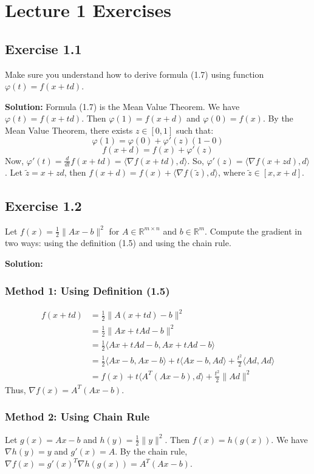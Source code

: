 \documentclass{article}
\begin{document}
\section*{Lecture 1 Exercises}

\subsection*{Exercise 1.1}
Make sure you understand how to derive formula (1.7) using function $\varphi(t) = f(x + td)$.

\textbf{Solution:}
Formula (1.7) is the Mean Value Theorem. We have $\varphi(t) = f(x + td)$.
Then $\varphi(1) = f(x + d)$ and $\varphi(0) = f(x)$.
By the Mean Value Theorem, there exists $z \in [0, 1]$ such that:
\[
\varphi(1) = \varphi(0) + \varphi'(z)(1 - 0)
\]
\[
f(x + d) = f(x) + \varphi'(z)
\]
Now, $\varphi'(t) = \frac{d}{dt} f(x + td) = \langle \nabla f(x + td), d \rangle$.
So, $\varphi'(z) = \langle \nabla f(x + zd), d \rangle$.
Let $\tilde{z} = x + zd$, then $f(x + d) = f(x) + \langle \nabla f(\tilde{z}), d \rangle$, where $\tilde{z} \in [x, x+d]$.

\subsection*{Exercise 1.2}
Let $f(x) = \frac{1}{2} \|Ax - b\|^2$ for $A \in \mathbb{R}^{m \times n}$ and $b \in \mathbb{R}^m$. Compute the gradient in two ways: using the definition (1.5) and using the chain rule.

\textbf{Solution:}
\subsubsection*{Method 1: Using Definition (1.5)}
\begin{align*}
f(x + td) &= \frac{1}{2} \|A(x + td) - b\|^2 \\
&= \frac{1}{2} \|Ax + tAd - b\|^2 \\
&= \frac{1}{2} \langle Ax + tAd - b, Ax + tAd - b \rangle \\
&= \frac{1}{2} \langle Ax - b, Ax - b \rangle + t \langle Ax - b, Ad \rangle + \frac{t^2}{2} \langle Ad, Ad \rangle \\
&= f(x) + t \langle A^T(Ax - b), d \rangle + \frac{t^2}{2} \|Ad\|^2
\end{align*}
Thus, $\nabla f(x) = A^T(Ax - b)$.

\subsubsection*{Method 2: Using Chain Rule}
Let $g(x) = Ax - b$ and $h(y) = \frac{1}{2} \|y\|^2$. Then $f(x) = h(g(x))$.
We have $\nabla h(y) = y$ and $g'(x) = A$.
By the chain rule, $\nabla f(x) = g'(x)^T \nabla h(g(x)) = A^T(Ax - b)$.
\end{document}
